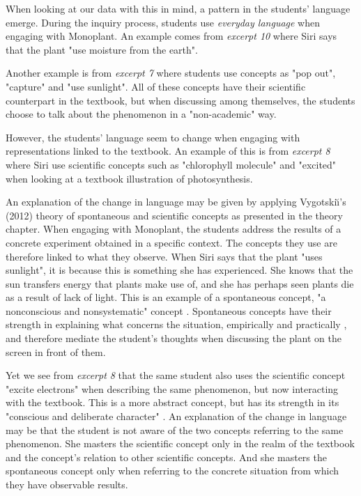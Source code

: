 When looking at our data with this in mind, a pattern in the students' language emerge. During the inquiry process, students use \emph{everyday language} when engaging with Monoplant. An example comes from \emph{excerpt 10} where Siri says that the plant "use moisture from the earth". 

Another example is from \emph{excerpt 7} where students use concepts as "pop out", "capture" and "use sunlight". All of these concepts have their scientific counterpart in the textbook, but when discussing among themselves, the students choose to talk about the phenomenon in a "non-academic" way. 

However, the students' language seem to change when engaging with representations linked to the textbook. An example of this is from \emph{excerpt 8} where Siri use scientific concepts such as "chlorophyll molecule" and "excited" when looking at a textbook illustration of photosynthesis. 

An explanation of the change in language may be given by applying Vygotski{\u\i}'s (2012) theory of spontaneous and scientific concepts as presented in the theory chapter. When engaging with Monoplant, the students address the results of a concrete experiment obtained in a specific context. The concepts they use are therefore linked to what they observe. When Siri says that the plant "uses sunlight", it is because this is something she has experienced. She knows that the sun transfers energy that plants make use of, and she has perhaps seen plants die as a result of lack of light. This is an example of a spontaneous concept, "a nonconscious and nonsystematic" concept \citep{vygotsky2012thought}. Spontaneous concepts have their strength in explaining what concerns the situation, empirically and practically \citep{vygotsky2012thought}, and  therefore mediate the student's thoughts when discussing the plant on the screen in front of them. 


Yet we see from \emph{excerpt 8} that the same student also uses the scientific concept "excite electrons" when describing the same phenomenon, but now interacting with the textbook. This is a more abstract concept, but has its strength in its "conscious and deliberate character" \citep{vygotsky2012thought}. An explanation of the change in language may be that the student is not aware of the two concepts referring to the same phenomenon. She masters the scientific concept only in the realm of the textbook and the concept's relation to other scientific concepts. And she masters the spontaneous concept only when referring to the concrete situation from which they have observable results. 

